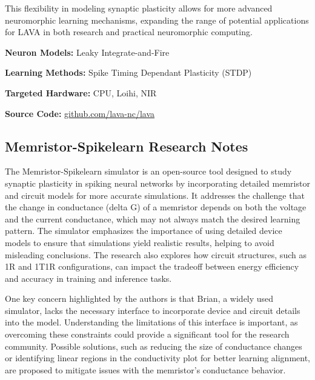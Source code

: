 This flexibility in modeling synaptic plasticity allows for more advanced neuromorphic learning mechanisms, expanding the range of potential applications for LAVA in both research and practical neuromorphic computing.

\begin{tcolorbox}[enhanced,attach boxed title to top center={yshift=-3mm,yshifttext=-1mm}, colback=blue!5!white,colframe=blue!75!black,colbacktitle=red!80!black, title=Lava at a Glance,fonttitle=\bfseries, boxed title style={size=small,colframe=red!50!black} ]

\textbf{Neuron Models:} Leaky Integrate-and-Fire

\textbf{Learning Methods:} Spike Timing Dependant Plasticity (STDP)  

\textbf{Targeted Hardware:} CPU, Loihi, NIR 

\textbf{Source Code:} \href{https://github.com/lava-nc/lava}{github.com/lava-nc/lava}
\end{tcolorbox}
\subsection*{Memristor-Spikelearn Research Notes}\label{Memristor-Spikelearn}

The Memristor-Spikelearn simulator is an open-source tool designed to study synaptic plasticity in spiking neural networks by incorporating detailed memristor and circuit models for more accurate simulations. It addresses the challenge that the change in conductance (delta G) of a memristor depends on both the voltage and the current conductance, which may not always match the desired learning pattern. The simulator emphasizes the importance of using detailed device models to ensure that simulations yield realistic results, helping to avoid misleading conclusions. The research also explores how circuit structures, such as 1R and 1T1R configurations, can impact the tradeoff between energy efficiency and accuracy in training and inference tasks.

One key concern highlighted by the authors is that Brian, a widely used simulator, lacks the necessary interface to incorporate device and circuit details into the model. Understanding the limitations of this interface is important, as overcoming these constraints could provide a significant tool for the research community. Possible solutions, such as reducing the size of conductance changes or identifying linear regions in the conductivity plot for better learning alignment, are proposed to mitigate issues with the memristor’s conductance behavior.

